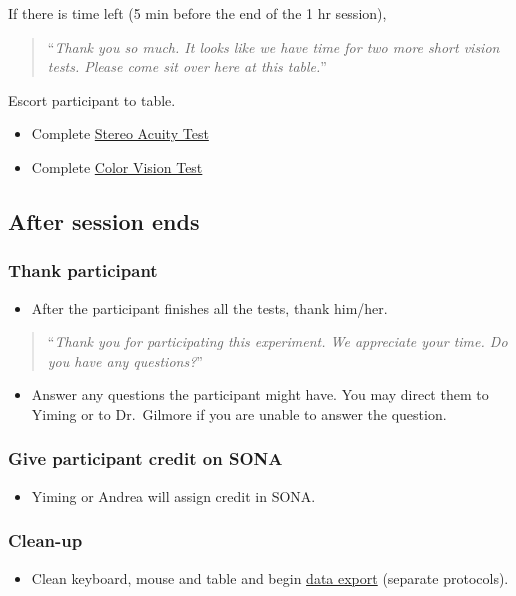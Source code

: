 \documentclass[]{article}
\providecommand{\tightlist}{%
  \setlength{\itemsep}{0pt}\setlength{\parskip}{0pt}}
\begin{document}
If there is time left (5 min before the end of the 1 hr session),

\begin{quote}
``\emph{Thank you so much. It looks like we have time for two more short
vision tests. Please come sit over here at this table.}''
\end{quote}

Escort participant to table.

\begin{itemize}
\tightlist
\item
  Complete \href{vision-screening-protocol.html}{Stereo Acuity Test}
\item
  Complete \href{vision-screening-protocol.html}{Color Vision Test}
\end{itemize}

\subsection{After session ends}\label{after-session-ends}

\subsubsection{Thank participant}\label{thank-participant}

\begin{itemize}
\tightlist
\item
  After the participant finishes all the tests, thank him/her.
\end{itemize}

\begin{quote}
``\emph{Thank you for participating this experiment. We appreciate your
time. Do you have any questions?}''
\end{quote}

\begin{itemize}
\tightlist
\item
  Answer any questions the participant might have. You may direct them
  to Yiming or to Dr.~Gilmore if you are unable to answer the question.
\end{itemize}

\subsubsection{Give participant credit on
SONA}\label{give-participant-credit-on-sona}

\begin{itemize}
\tightlist
\item
  Yiming or Andrea will assign credit in SONA.
\end{itemize}

\subsubsection{Clean-up}\label{clean-up}

\begin{itemize}
\tightlist
\item
  Clean keyboard, mouse and table and begin
  \href{sex-differences-data-export.md}{data export} (separate
  protocols).
\end{itemize}
\end{document}
